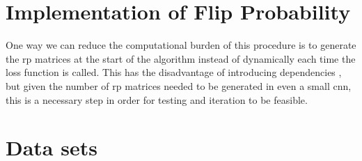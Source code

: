 



\section{Implementation of Flip Probability}

One way we can reduce the computational burden of this procedure is to generate the \gls{rp} matrices at the start of the algorithm instead of dynamically each time the loss function is called. This has the disadvantage of introducing dependencies \cite{bob_rp_storage}, but given the number of \gls{rp} matrices needed to be generated in even a small \gls{cnn}, this is a necessary step in order for testing and iteration to be feasible. 
\bigskip



\section{Data sets}
 
%


